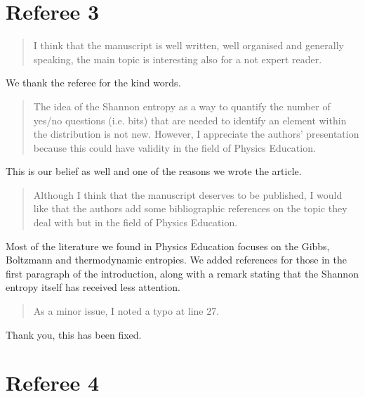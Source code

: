 \documentclass[11pt]{article}
\begin{document}
\section*{Referee 3}

\begin{quote}
	I think that the manuscript is well written, well organised and generally speaking, the main topic is interesting also for a not expert reader. 
\end{quote}

We thank the referee for the kind words.

\begin{quote}
The idea of the Shannon entropy as a way to quantify the number of yes/no questions (i.e. bits) that are needed to identify an element within the distribution is not new. However, I appreciate the authors' presentation because this could have validity in the field of Physics Education.
\end{quote}

This is our belief as well and one of the reasons we wrote the article.

\begin{quote}
Although I think that the manuscript deserves to be published, I would like that the authors add some bibliographic references on the topic they deal with but in the field of Physics Education.
\end{quote}

Most of the literature we found in Physics Education focuses on the Gibbs, Boltzmann and thermodynamic entropies. We added references for those in the first paragraph of the introduction, along with a remark stating that the Shannon entropy itself has received less attention.

\begin{quote}
As a minor issue, I noted a typo at line 27.
\end{quote}

Thank you, this has been fixed.

\section*{Referee 4}
\end{document}
